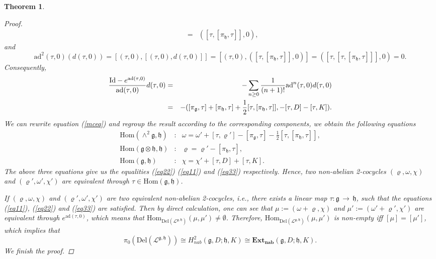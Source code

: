 \documentclass[12pt]{amsart}
\newtheorem{thm}{Theorem}[section]
\newcommand{\lon }{\,\rightarrow\,}
\newcommand{\g}{\mathfrak g}
\newcommand{\h}{\mathfrak h}
\newcommand{\huaL}{\mathcal{L}}
\newcommand{\Id}{{\rm{Id}}}
\newcommand{\Hom}{\mathrm{Hom}}
\newcommand{\ad}{\mathrm{ad}}
\begin{document}
\begin{thm}
\begin{proof}
\begin{eqnarray*}
            &=&([\tau,[\pi_{\h},\tau]],0),
        \end{eqnarray*}
        and 
        $$\ad^{2}(\tau,0)(d(\tau,0))=[(\tau,0),[(\tau,0),d(\tau,0)]]=[(\tau,0),([\tau,[\pi_{\h},\tau]],0)]=([\tau,[\tau,[\pi_{\h},\tau]]],0)=0.$$
        Consequently,
        \begin{eqnarray*}
            \frac{\Id-e^{\ad(\tau,0)}}{\ad(\tau,0)}d(\tau,0)&=&-\sum_{n\geq0}\frac{1}{(n+1)!}\ad^{n}(\tau,0)d(\tau,0)\\
            &=&-([\pi_{\g},\tau]+[\pi_{\h},\tau]+\frac{1}{2}[\tau,[\pi_{\h},\tau]],-[\tau,D]-[\tau,K]).
        \end{eqnarray*}
        We can rewrite equation (\ref{mceq}) and regroup the result according to the corresponding components, we obtain the following equations
        \begin{eqnarray*}
            \Hom(\wedge^{2}\g,\h)&:& \omega=\omega'+[\tau,\varrho']-[\pi_{\g},\tau]-\frac{1}{2}[\tau,[\pi_{\h},\tau]],\\
            \Hom(\g\otimes\h,\h)&:& \varrho=\varrho'-[\pi_{\h},\tau],\\
            \Hom(\g,\h)&:&   \chi=\chi'+[\tau,D]+[\tau,K].
        \end{eqnarray*}
        The above three equations give us the equalities (\ref{eq22}) (\ref{eq11}) and (\ref{eq33}) respectively. Hence, two non-abelian 2-cocycles $(\varrho,\omega,\chi)$ and $(\varrho',\omega',\chi')$ are equivalent through $\tau\in\Hom(\g,\h)$.

    If $(\varrho,\omega,\chi)$ and $(\varrho',\omega',\chi')$ are two equivalent non-abelian 2-cocycles, i.e., there exists a linear map $\tau:\g\lon\h$, such that the equations (\ref{eq11}), (\ref{eq22}) and (\ref{eq33}) are satisfied. Then by direct calculation, one can see that $\mu:=(\omega+\varrho,\chi)$ and $\mu':=(\omega'+\varrho',\chi')$ are equivalent through $e^{\ad(\tau,0)}$, which means that $\Hom_{\mathrm{Del}(\huaL^{\g, \h})}(\mu, \mu')\neq \emptyset$.
Therefore, $\Hom_{\mathrm{Del}(\huaL^{\g, \h})}(\mu, \mu')$ is non-empty iff $[\mu]=[\mu']$, which implies that
$$
\pi_0(\mathrm{Del}(\huaL^{\g, \h}))\cong H^2_{nab}(\g, D; \h,K)\cong\mathbf{Ext_{nab}}(\g,D;\h,K).$$
We finish the proof.        
\end{proof}
\end{thm}
\end{document}
